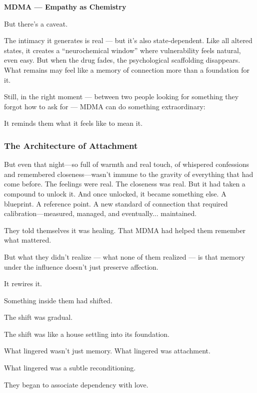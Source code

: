 \begin{TechnicalSidebar}{\textbf{MDMA — Empathy as Chemistry}}
  \medskip
  
  But there’s a caveat.

  \medskip
  
  The intimacy it generates is real — but it’s also state-dependent. Like all altered states, it creates a “neurochemical window” where vulnerability feels natural, even easy. But when the drug fades, the psychological scaffolding disappears. What remains may feel like a memory of connection more than a foundation for it.
  
  \medskip
  
  Still, in the right moment — between two people looking for something they forgot how to ask for — MDMA can do something extraordinary:
  
  \medskip
  
  It reminds them what it feels like to mean it.
  
\end{TechnicalSidebar}
  



\subsubsection{The Architecture of Attachment}

But even that night—so full of warmth and real touch, of whispered confessions and remembered 
closeness—wasn’t immune to the gravity of everything that had come before. The feelings were 
real. The closeness was real. But it had taken a compound to unlock it. And once unlocked, 
it became something else. A blueprint. A reference point. A new standard of connection that 
required calibration—measured, managed, and eventually... maintained.

They told themselves it was healing. That MDMA had helped them remember what mattered.

But what they didn’t realize --- what none of them realized --- is that memory under the influence 
doesn't just preserve affection.

It rewires it.

Something inside them had shifted. 

The shift was gradual. 

The shift was like a house settling into its foundation. 

What lingered wasn’t just memory. 
What lingered was attachment. 

What lingered was a subtle reconditioning. 

They began to associate dependency with love. 


